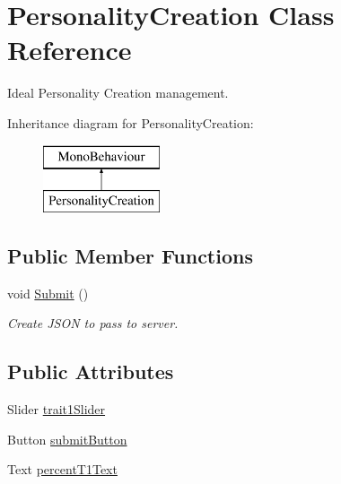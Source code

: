 \hypertarget{class_personality_creation}{}\section{Personality\+Creation Class Reference}
\label{class_personality_creation}


Ideal Personality Creation management.  


Inheritance diagram for Personality\+Creation\+:\begin{figure}[H]
\begin{center}
\leavevmode
\includegraphics[height=2.000000cm]{class_personality_creation}
\end{center}
\end{figure}
\subsection*{Public Member Functions}
\begin{DoxyCompactItemize}
\item 
void \mbox{\hyperlink{class_personality_creation_a464be274e82be75bab0899f8756c9562}{Submit}} ()
\begin{DoxyCompactList}\small\item\em Create J\+S\+ON to pass to server. \end{DoxyCompactList}\end{DoxyCompactItemize}
\subsection*{Public Attributes}
\begin{DoxyCompactItemize}
\item 
Slider \mbox{\hyperlink{class_personality_creation_aa951821515495d458db8fc1b4a83ea4f}{trait1\+Slider}}
\item 
Button \mbox{\hyperlink{class_personality_creation_a4b841ca4b3004940300135d79365beac}{submit\+Button}}
\item 
Text \mbox{\hyperlink{class_personality_creation_ac4714076ddafa535821be12ec0669692}{percent\+T1\+Text}}
\end{DoxyCompactItemize}
